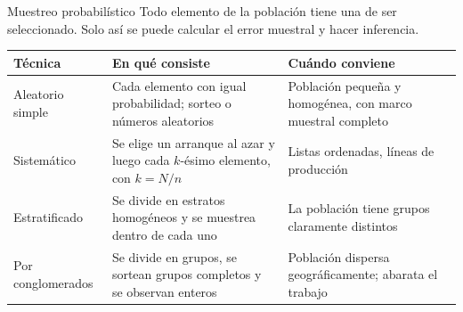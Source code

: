 \documentclass[aspectratio=169,10pt]{beamer}
\begin{document}
\begin{frame}{Muestreo probabilístico}
  Todo elemento de la población tiene una  de ser seleccionado. Solo así se puede calcular el error
  muestral y hacer inferencia.

  \vspace{0.15cm}
  \scriptsize
  \begin{center}
  \begin{tabular}{@{}p{2.5cm}p{4.5cm}p{4.5cm}@{}}
    \toprule
    \textbf{Técnica} & \textbf{En qué consiste} & \textbf{Cuándo conviene} \\
    \midrule
    Aleatorio simple & Cada elemento con igual probabilidad; sorteo o números
      aleatorios & Población pequeña y homogénea, con marco muestral completo \\
    \addlinespace
    Sistemático & Se elige un arranque al azar y luego cada $k$-ésimo elemento,
      con $k=N/n$ & Listas ordenadas, líneas de producción \\
    \addlinespace
    Estratificado & Se divide en estratos homogéneos y se muestrea dentro de
      cada uno & La población tiene grupos claramente distintos \\
    \addlinespace
    Por conglomerados & Se divide en grupos, se sortean grupos completos y se
      observan enteros & Población dispersa geográficamente; abarata el trabajo \\
    \bottomrule
  \end{tabular}
  \end{center}
\end{frame}
\end{document}

